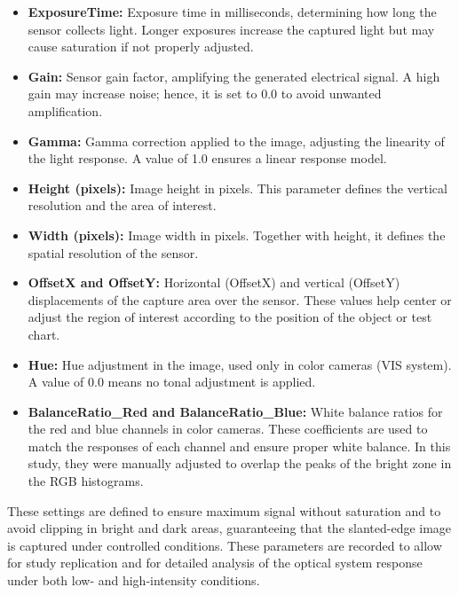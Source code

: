 \begin{itemize}
    \item \textbf{ExposureTime:} Exposure time in milliseconds, determining how long the sensor collects light. Longer exposures increase the captured light but may cause saturation if not properly adjusted.

    \item \textbf{Gain:} Sensor gain factor, amplifying the generated electrical signal. A high gain may increase noise; hence, it is set to 0.0 to avoid unwanted amplification.

    \item \textbf{Gamma:} Gamma correction applied to the image, adjusting the linearity of the light response. A value of 1.0 ensures a linear response model.

    \item \textbf{Height (pixels):} Image height in pixels. This parameter defines the vertical resolution and the area of interest.

    \item \textbf{Width (pixels):} Image width in pixels. Together with height, it defines the spatial resolution of the sensor.

    \item \textbf{OffsetX and OffsetY:} Horizontal (OffsetX) and vertical (OffsetY) displacements of the capture area over the sensor. These values help center or adjust the region of interest according to the position of the object or test chart.

    \item \textbf{Hue:} Hue adjustment in the image, used only in color cameras (VIS system). A value of 0.0 means no tonal adjustment is applied.

    \item \textbf{BalanceRatio\_Red and BalanceRatio\_Blue:} White balance ratios for the red and blue channels in color cameras. These coefficients are used to match the responses of each channel and ensure proper white balance. In this study, they were manually adjusted to overlap the peaks of the bright zone in the RGB histograms.
\end{itemize}

\noindent These settings are defined to ensure maximum signal without saturation and to avoid clipping in bright and dark areas, guaranteeing that the slanted-edge image is captured under controlled conditions. These parameters are recorded to allow for study replication and for detailed analysis of the optical system response under both low- and high-intensity conditions.

